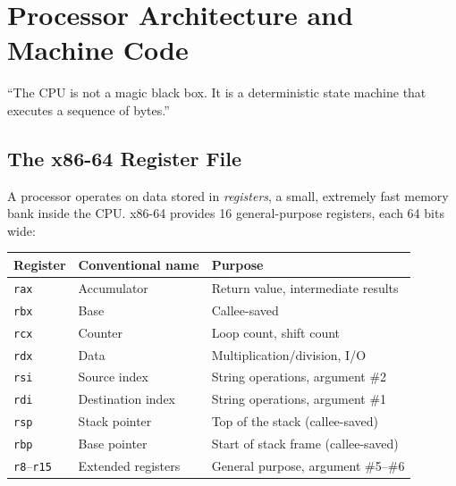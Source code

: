 \chapter{Processor Architecture and Machine Code}
\label{ch:architecture}

\epigraph{``The CPU is not a magic black box. It is a deterministic state machine that executes a sequence of bytes.''}{}


\section{The x86-64 Register File}

A processor operates on data stored in \emph{registers}, a small, extremely fast memory bank inside the CPU. x86-64 provides 16 general-purpose registers, each 64 bits wide:

\begin{longtable}{p{2.5cm}p{3cm}p{6cm}}
	\toprule
	\textbf{Register}         & \textbf{Conventional name} & \textbf{Purpose}                    \\
	\midrule
	\texttt{rax}              & Accumulator                & Return value, intermediate results  \\
	\texttt{rbx}              & Base                       & Callee-saved                        \\
	\texttt{rcx}              & Counter                    & Loop count, shift count             \\
	\texttt{rdx}              & Data                       & Multiplication/division, I/O        \\
	\texttt{rsi}              & Source index               & String operations, argument \#2     \\
	\texttt{rdi}              & Destination index          & String operations, argument \#1     \\
	\texttt{rsp}              & Stack pointer              & Top of the stack (callee-saved)     \\
	\texttt{rbp}              & Base pointer               & Start of stack frame (callee-saved) \\
	\texttt{r8}--\texttt{r15} & Extended registers         & General purpose, argument \#5--\#6  \\
	\bottomrule
\end{longtable}

